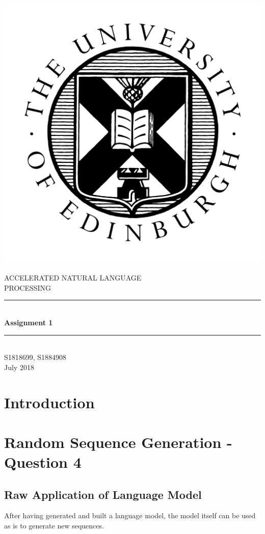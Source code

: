\documentclass[12pt]{article}
\begin{document}
	
	
\begin{titlepage}
	\newcommand{\HRule}{\rule{\linewidth}{0.5mm}} %
	\center %
	\includegraphics[width = 0.3 \linewidth]{"./graphics/avatar-roundel-blackonwhite"}\\[0.5cm]
	\textsc{\\[1cm]\LARGE ACCELERATED NATURAL LANGUAGE \\
             \hfill\break PROCESSING}\\[2cm]

	\HRule \\[0.4cm]
	{ \huge \bfseries Assignment 1}\\[0.1cm]
	\HRule \\[1.5cm]
	\Large
	\vfill
	 S1818699, S1884908\\[0.5cm]
	{\large July 2018}
\end{titlepage}
\setlength\parindent{0pt}		
\newpage
\doublespacing
\tableofcontents
\singlespacing
\newpage
	
\section{Introduction}

\section{Random Sequence Generation - Question 4}
\subsection{Raw Application of Language Model}
After having generated and built a language model, the model itself can be used as is to generate new sequences.
\end{document}
